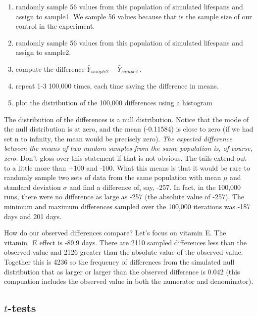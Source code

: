 \documentclass[]{book}
\providecommand{\tightlist}{%
  \setlength{\itemsep}{0pt}\setlength{\parskip}{0pt}}
\theoremstyle{definition}
\theoremstyle{definition}
\theoremstyle{definition}
\theoremstyle{remark}
\begin{document}
\begin{enumerate}
\def\labelenumi{\arabic{enumi}.}
\tightlist
\item
  randomly sample 56 values from this population of simulated lifespans
  and assign to sample1. We sample 56 values because that is the sample
  size of our control in the experiment.
\item
  randomly sample 56 values from this population of simulated lifespans
  and assign to sample2.
\item
  compute the difference \(\bar{Y}_{sample2} - \bar{Y}_{sample1}\).
\item
  repeat 1-3 100,000 times, each time saving the difference in means.
\item
  plot the distribution of the 100,000 differences using a histogram
\end{enumerate}

The distribution of the differences is a null distribution. Notice that
the mode of the null distribution is at zero, and the mean (-0.11584) is
close to zero (if we had set n to infinity, the mean would be precisely
zero). \emph{The expected difference between the means of two random
samples from the same population is, of course, zero}. Don't gloss over
this statement if that is not obvious. The tails extend out to a little
more than +100 and -100. What this means is that it would be rare to
randomly sample two sets of data from the same population with mean
\(\mu\) and standard deviation \(\sigma\) and find a difference of, say,
-257. In fact, in the 100,000 runs, there were no difference as large as
\textbar{}-257\textbar{} (the absolute value of -257). The minimum and
maximum differences sampled over the 100,000 iterations was -187 days
and 201 days.

How do our observed differences compare? Let's focus on vitamin E. The
vitamin\_E effect is -89.9 days. There are 2110 sampled differences less
than the observed value and 2126 greater than the absolute value of the
observed value. Together this is 4236 so the frequency of differences
from the simulated null distribution that as larger or larger than the
observed difference is 0.042 (this compuation includes the observed
value in both the numerator and denominator).

\subsection{\texorpdfstring{\(t\)-tests}{t-tests}}\label{t-tests}
\end{document}
